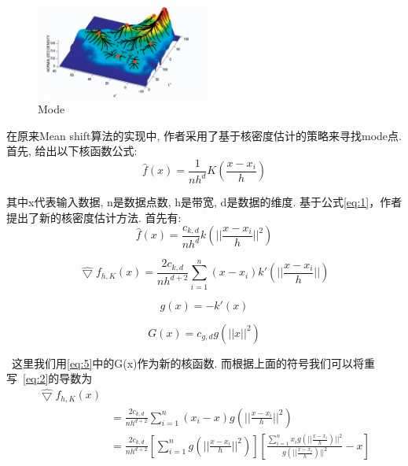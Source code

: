 \documentclass[a4paper, 11pt]{article}
\begin{document}
\begin{figure}[!htb]    
    \centering
    \includegraphics[width=0.5\textwidth]{images/mode.png}
    \caption{Mode}
    \label{fig:mode}
\end{figure}



在原来Mean shift算法的实现中, 作者采用了基于核密度估计的策略来寻找mode点. 首先, 给出以下核函数公式:
\begin{equation} \label{eq:1}
    \hat{f}(x)=\frac{1}{nh^d}K(\frac{x-x_i}{h})
\end{equation}

其中x代表输入数据, n是数据点数, h是带宽, d是数据的维度. 基于公式\ref{eq:1}，作者提出了新的核密度估计方法. 首先有:
\begin{equation}\label{eq:2}
    \hat{f}(x)=\frac{c_{k,d}}{nh^d}k(||\frac{x-x_i}{h}||^2)
\end{equation}

\begin{equation}\label{eq:3}
    \hat{\bigtriangledown }f_{h,K}(x)=\frac{2c_{k,d}}{nh^{d+2}}\sum^n_{i=1}(x-x_i)k'(||\frac{x-x_i}{h}||)
\end{equation}

\begin{equation}\label{eq:4}
    g(x)=-k'(x)
\end{equation}
    
\begin{equation}\label{eq:5}
    G(x)=c_{g,d}g(||x||^2)
\end{equation}

 这里我们用\ref{eq:5}中的G(x)作为新的核函数. 而根据上面的符号我们可以将重写~\ref{eq:2}的导数为
\begin{equation}\label{eq:6}
    \begin{split}
        \hat{\bigtriangledown }f_{h,K}(x)\\
        &=\frac{2c_{k,d}}{nh^{d+2}}\sum^n_{i=1}(x_i-x)g(||\frac{x-x_i}{h}||^2)\\
        &=\frac{2c_{k,d}}{nh^{d+2}}[\sum^n_{i=1}g(||\frac{x-x_i}{h}||^2)][\frac{\sum_{i=1}^nx_ig(||\frac{x-x_i}{h})||^2}{g(||\frac{x-x_i}{h})||^2}-x]
    \end{split}
\end{equation}
\end{document}
